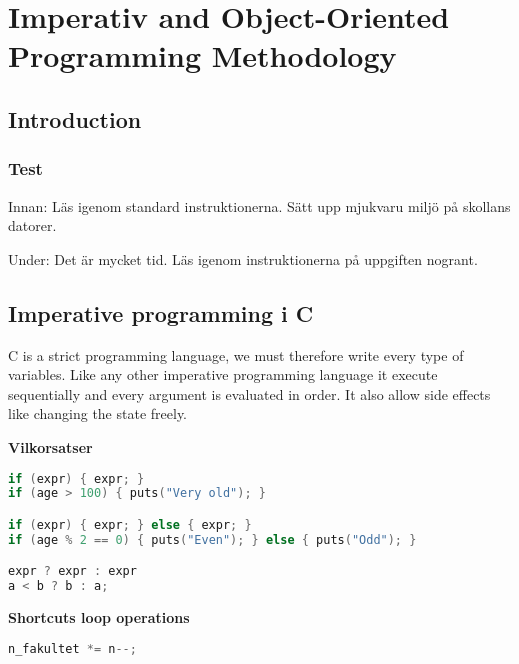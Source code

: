 \chapter{Imperativ and Object-Oriented Programming Methodology}

\newpage


\section{Introduction}

\subsection{Test}
Innan: \newline
Läs igenom standard instruktionerna. \newline
Sätt upp mjukvaru miljö på skollans datorer. \newline

Under: \newline
Det är mycket tid. \newline
Läs igenom instruktionerna på uppgiften nogrant. \newline



\section{Imperative programming i C}
C is a strict programming language, we must therefore write every type of variables.
Like any other imperative programming language it execute sequentially and every argument is evaluated
in order. It also allow side effects like changing the state freely. 

\noindent\textbf{Vilkorsatser}
\begin{lstlisting}[language=C]
if (expr) { expr; } 
if (age > 100) { puts("Very old"); } 

if (expr) { expr; } else { expr; }
if (age % 2 == 0) { puts("Even"); } else { puts("Odd"); }

expr ? expr : expr
a < b ? b : a;
\end{lstlisting}

\noindent\textbf{Shortcuts loop operations}
\begin{lstlisting}[language=C]
n_fakultet *= n--;
\end{lstlisting}


